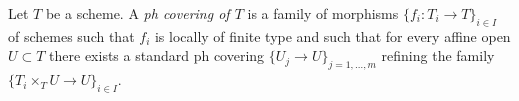 \begin{definition}
\label{definition-ph-covering}
Let $T$ be a scheme. A {\it ph covering of $T$} is a family
of morphisms $\{f_i : T_i \to T\}_{i \in I}$ of schemes such
that $f_i$ is locally of finite type and such that for every
affine open $U \subset T$ there exists a standard ph covering
$\{U_j \to U\}_{j = 1, \ldots, m}$ refining the family
$\{T_i \times_T U \to U\}_{i \in I}$.
\end{definition}